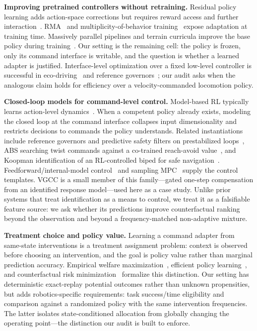 \documentclass{article}
\begin{document}
\textbf{Improving pretrained controllers without retraining.}
Residual policy learning adds action-space corrections but requires reward access
and further interaction~\citep{silver2018residual,johannink2019residual}.
RMA~\citep{kumar2021rma} and multiplicity-of-behavior
training~\citep{margolis2022walk} expose adaptation at training time.
Massively parallel pipelines and terrain curricula improve the base policy during
training~\citep{rudin2022learning,makoviychuk2021isaac,mittal2023orbit,lee2020learning,miki2022learning}.
Our setting is the remaining cell: the policy is frozen, only its command
interface is writable, and the question is whether a learned adapter is justified.
Interface-level optimization over a fixed low-level controller is successful in
eco-driving~\citep{sciarretta2015ecodriving} and reference
governors~\citep{garone2017reference}; our audit asks when the analogous claim
holds for efficiency over a velocity-commanded locomotion policy.

\textbf{Closed-loop models for command-level control.}
Model-based RL typically learns action-level
dynamics~\citep{deisenroth2011pilco,chua2018deep,janner2019trust,hafner2020dream,hansen2022temporal,nagabandi2018neural}.
When a competent policy already exists, modeling the closed loop at the command
interface collapses input dimensionality and restricts decisions to commands the
policy understands. Related instantiations include reference governors and
predictive safety filters on prestabilized
loops~\citep{garone2017reference,wabersich2021predictive}, ABS searching twist
commands against a co-trained reach-avoid value~\citep{he2024agile}, and
Koopman identification of an RL-controlled biped for safe
navigation~\citep{kim2024koopman}. Feedforward/internal-model
control~\citep{astrom2008feedback,francis1976internal} and sampling
MPC~\citep{mayne2000constrained,williams2018information,kabzan2019learning,dicarlo2018dynamic}
supply the control templates. VGCC is a small member of this family---gated
one-step compensation from an identified response model---used here as a case
study. Unlike prior systems that treat identification as a means to control, we
treat it as a falsifiable feature source: we ask whether its predictions improve
counterfactual ranking beyond the observation and beyond a frequency-matched
non-adaptive mixture.

\textbf{Treatment choice and policy value.}
Learning a command adapter from same-state interventions is a treatment
assignment problem: context is observed before choosing an intervention, and the
goal is policy value rather than marginal prediction accuracy. Empirical welfare
maximization~\citep{kitagawa2018treatment}, efficient policy
learning~\citep{athey2021policy}, and counterfactual risk
minimization~\citep{swaminathan2015crm} formalize this distinction.
Our setting has deterministic exact-replay potential outcomes rather than
unknown propensities, but adds robotics-specific requirements: task success/time
eligibility and comparison against a randomized policy with the same intervention
frequencies. The latter isolates state-conditioned allocation from globally
changing the operating point---the distinction our audit is built to enforce.
\end{document}
